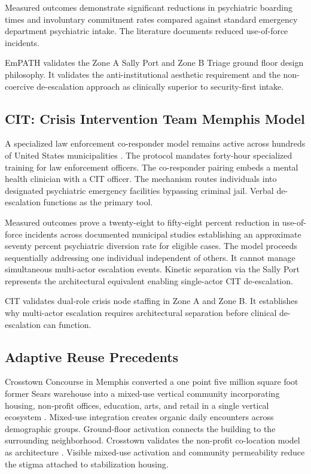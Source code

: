 \documentclass[12pt, letterpaper]{article}
\begin{document}
Measured outcomes demonstrate significant reductions in psychiatric boarding times and involuntary commitment rates compared against standard emergency department psychiatric intake. The literature documents reduced use-of-force incidents.

EmPATH validates the Zone A Sally Port and Zone B Triage ground floor design philosophy. It validates the anti-institutional aesthetic requirement and the non-coercive de-escalation approach as clinically superior to security-first intake.

\subsection{CIT: Crisis Intervention Team Memphis Model}

A specialized law enforcement co-responder model remains active across hundreds of United States municipalities \citep{cit_memphis_model_2023}. The protocol mandates forty-hour specialized training for law enforcement officers. The co-responder pairing embeds a mental health clinician with a CIT officer. The mechanism routes individuals into designated psychiatric emergency facilities bypassing criminal jail. Verbal de-escalation functions as the primary tool.

Measured outcomes prove a twenty-eight to fifty-eight percent reduction in use-of-force incidents across documented municipal studies establishing an approximate seventy percent psychiatric diversion rate for eligible cases. The model proceeds sequentially addressing one individual independent of others. It cannot manage simultaneous multi-actor escalation events. Kinetic separation via the Sally Port represents the architectural equivalent enabling single-actor CIT de-escalation.

CIT validates dual-role crisis node staffing in Zone A and Zone B. It establishes why multi-actor escalation requires architectural separation before clinical de-escalation can function.

\subsection{Adaptive Reuse Precedents}

Crosstown Concourse in Memphis converted a one point five million square foot former Sears warehouse into a mixed-use vertical community incorporating housing, non-profit offices, education, arts, and retail in a single vertical ecosystem \citep{crosstown_concourse_2017}. Mixed-use integration creates organic daily encounters across demographic groups. Ground-floor activation connects the building to the surrounding neighborhood. Crosstown validates the non-profit co-location model as architecture \citep{la_planning_aro_2026}. Visible mixed-use activation and community permeability reduce the stigma attached to stabilization housing.
\end{document}
